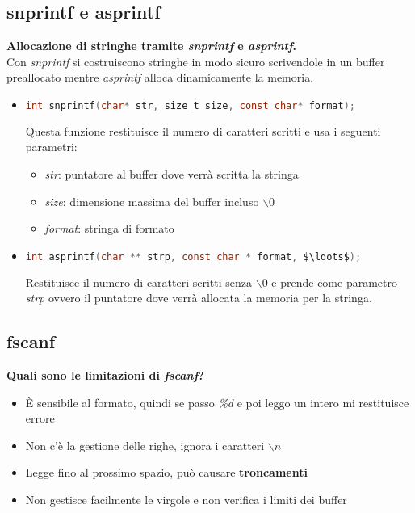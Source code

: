 \documentclass[a4paper,10pt]{article}
\theoremstyle{remark}
\theoremstyle{definition}
\theoremstyle{plain}
\theoremstyle{definition}
\theoremstyle{definition}
\theoremstyle{definition}
\theoremstyle{plain}
\theoremstyle{plain}
\begin{document}
\subsection{snprintf e asprintf}
\textbf{Allocazione di stringhe tramite \textit{snprintf} e \textit{asprintf}.}\\
Con \textit{snprintf} si costruiscono stringhe in modo sicuro scrivendole in un buffer preallocato mentre \textit{asprintf} alloca dinamicamente la memoria.
\begin{itemize}
	\item \begin{lstlisting}[language=C]
		int snprintf(char* str, size_t size, const char* format);
	\end{lstlisting}
	Questa funzione restituisce il numero di caratteri scritti e usa i seguenti parametri:
	\begin{itemize}
		\item \textit{str}: puntatore al buffer dove verrà scritta la stringa
		\item \textit{size}: dimensione massima del buffer incluso \textit{$\backslash 0$}
		\item \textit{format}: stringa di formato
	\end{itemize}
	\item \begin{lstlisting}[language=C, mathescape]
		int asprintf(char ** strp, const char * format, $\ldots$);
	\end{lstlisting}
	Restituisce il numero di caratteri scritti senza $\backslash 0$ e prende come parametro \textit{strp} ovvero il puntatore dove verrà allocata la memoria per la stringa.
\end{itemize}
\subsection{fscanf}
\textbf{Quali sono le limitazioni di \textit{fscanf}?}\\
\begin{itemize}
	\item È sensibile al formato, quindi se passo \textit{\%d} e poi leggo un intero mi restituisce errore
	\item Non c'è la gestione delle righe, ignora i caratteri \textit{$\backslash n$}
	\item Legge fino al prossimo spazio, può causare \textbf{troncamenti}
	\item Non gestisce facilmente le virgole e non verifica i limiti dei buffer
\end{itemize}
\end{document}
